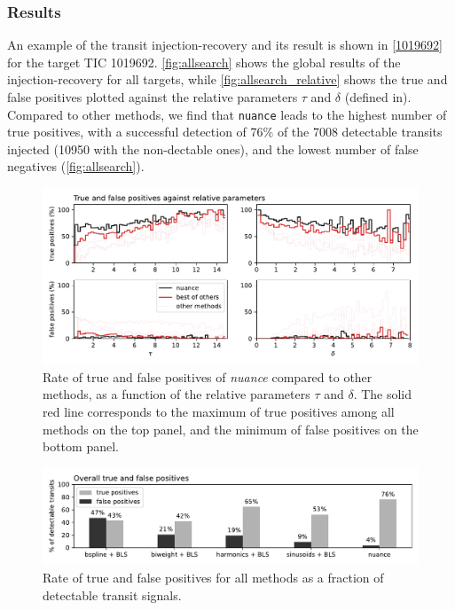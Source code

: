 \documentclass[modern]{aastex631}
\newcommand{\nuancemethod}{\textit{nuance}}
\newcommand{\nuance}{\nuancemethod{}}
\begin{document}
\newpage
\subsubsection*{Results}
An example of the transit injection-recovery and its result is shown in \autoref{1019692} for the target TIC 1019692. \autoref{fig:allsearch} shows the global results of the injection-recovery for all targets, while \autoref{fig:allsearch_relative} shows the true and false positives plotted against the relative parameters $\tau$ and $\delta$ (defined in). Compared to other methods, we find that \texttt{nuance} leads to the highest number of true positives, with a successful detection of 76\% of the 7008 detectable transits injected (10950 with the non-dectable ones), and the lowest number of false negatives (\autoref{fig:allsearch}).
\begin{figure}[H]
    \begin{centering}
        \includegraphics[width=\linewidth]{../workflows/tess_injection_recovery/figures/true_false_positives.pdf}
        \caption{Rate of true and false positives of \nuance{} compared to other methods, as a function of the relative parameters $\tau$ and $\delta$. The solid red line corresponds to the maximum of true positives among all methods on the top panel, and the minimum of false positives on the bottom panel.}
        \label{fig:allsearch_relative}
    \end{centering}
\end{figure}
\begin{figure}[H]
    \begin{centering}
        \includegraphics[width=\linewidth]{../workflows/tess_injection_recovery/figures/true_and_false_positives_bars.pdf}
        \caption{Rate of true and false positives for all methods as a fraction of detectable transit signals.}
        \label{fig:allsearch}
    \end{centering}
\end{figure}
\end{document}
